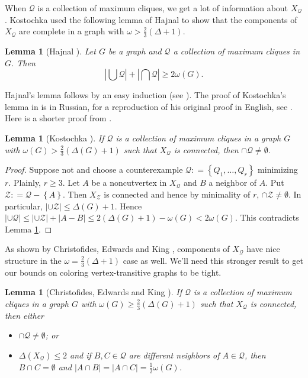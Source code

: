 \documentclass[12pt]{article}
\theoremstyle{plain}
\newtheorem{lem}[thm]{Lemma}
\theoremstyle{definition}
\theoremstyle{remark}
\newcommand{\fancy}[1]{\mathcal{#1}}
\newcommand{\set}[1]{\left\{ #1 \right\}}
\newcommand{\card}[1]{\left|#1\right|}
\newcommand{\DefinedAs}{\mathrel{\mathop:}=}
\def\Q{\fancy{Q}}
\begin{document}
When $\Q$ is a collection of maximum cliques, we get a lot of information about $X_\Q$.  Kostochka \cite{kostochkaRussian} used the following lemma of Hajnal \cite{HajnalSaturation} to show that the components of $X_\Q$ are complete in a graph with $\omega > \frac23 (\Delta + 1)$.

\begin{lem}[Hajnal \cite{HajnalSaturation}]\label{HajnalLemma}
Let $G$ be a graph and $\Q$ a collection of maximum cliques in $G$. Then \[\card{\bigcup \Q} + \card{\bigcap \Q} \geq 2\omega(G).\]
\end{lem}

Hajnal's lemma follows by an easy induction (see \cite{rabernhitting}).  The proof of Kostochka's lemma in \cite{kostochkaRussian} is in Russian, for a reproduction of his original proof in English, see \cite{rabernhitting}.  Here is a shorter proof from \cite{raberndiss}.

\begin{lem}[Kostochka \cite{kostochkaRussian}]\label{KostochkaCliqueGraph}
If $\Q$ is a collection of maximum cliques in a graph $G$ with $\omega(G) > \frac23 (\Delta(G) + 1)$ such that $X_\Q$ is connected, then $\cap \Q \neq \emptyset$. 
\end{lem}
\begin{proof}
Suppose not and choose a counterexample $\Q \DefinedAs \set{Q_1, \ldots, Q_r}$ minimizing $r$. Plainly, $r \geq 3$. Let $A$ be a noncutvertex in $X_{\Q}$ and $B$ a neighbor of $A$. Put $\fancy{Z} \DefinedAs \Q - \set{A}$. Then $X_{\fancy{Z}}$ is connected and hence by minimality of $r$, $\cap \fancy{Z} \neq \emptyset$. In particular, $\card{\cup \fancy{Z}} \leq \Delta(G) + 1$. Hence $\card{\cup \Q} \leq \card{\cup \fancy{Z}} + \card{A - B} \leq 2(\Delta(G) + 1) - \omega(G) < 2\omega(G)$. This contradicts Lemma \ref{HajnalLemma}.
\end{proof}

As shown by Christofides, Edwards and King \cite{christofides2012note}, components of $X_\Q$ have nice structure in the $\omega = \frac23 (\Delta + 1)$ case as well.  We'll need this stronger result to get our bounds on coloring vertex-transitive graphs to be tight.

\begin{lem}[Christofides, Edwards and King \cite{christofides2012note}]\label{TwoThirdsEqualityStructure}
If $\Q$ is a collection of maximum cliques in a graph $G$ with $\omega(G) \ge \frac23 (\Delta(G) + 1)$ such that $X_\Q$ is connected, then either 
\begin{itemize}
\item $\cap \Q \ne \emptyset$; or
\item $\Delta(X_\Q) \le 2$ and if $B, C \in \Q$ are different neighbors of $A \in \Q$, then $B \cap C = \emptyset$ and $\card{A \cap B} = \card{A \cap C} = \frac12 \omega(G)$.
\end{itemize}

\end{lem}
\end{document}
